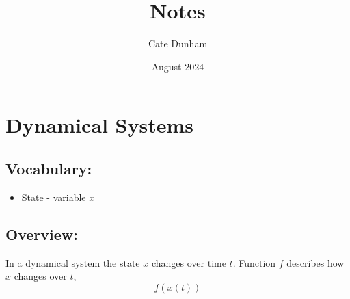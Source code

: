 \documentclass{article}
\title{Notes}
\author{Cate Dunham}
\date{August 2024}
\begin{document}
\maketitle

\section{Dynamical Systems}

\subsection{Vocabulary:}
\begin{itemize}
    \item State - variable $x$
\end{itemize}

\subsection{Overview:}
In a dynamical system the state $x$ changes over time $t$. Function $f$ describes how $x$ changes over $t$, 
\begin{equation}
    f(x(t))
\end{equation}
\end{document}
